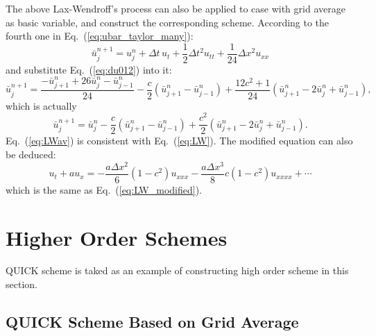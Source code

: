 \documentclass[]{article}
\begin{document}
The above Lax-Wendroff's process can also be applied to case with grid
average as basic variable, and construct the corresponding scheme.
According to the fourth one in Eq.~(\ref{eq:ubar_taylor_many}):
\[
    \bar u_{j}^{n+1}  = u_j^n+\Delta t\, u_t + \frac{1}{2}\Delta t^2
    u_{tt} + \frac{1}{24} \Delta x^2 u_{xx}
\]
and substitute Eq.~(\ref{eq:du012}) into it:
\[
    \bar u_j^{n+1}  = \frac{-\bar u_{j+1}^n + 26\bar u_j^n - \bar u_{j-1}^n}{24}-
    \frac{c}{2}\left(\bar u_{j+1}^n-\bar u_{j-1}^n\right) +
    \frac{12c^2+1}{24}\left(\bar u_{j+1}^n-2\bar u_j^n+\bar
    u_{j-1}^n\right),
\]
which is actually
\begin{equation}
    \bar u_j^{n+1} = \bar u_j^n -\frac{c}{2}\left(\bar u_{j+1}^n-\bar u_{j-1}^n\right) +
    \frac{c^2}{2}\left(\bar u_{j+1}^n-2\bar u_j^n+\bar u_{j-1}^n\right).
    \label{eq:LWav}
\end{equation}
Eq.~(\ref{eq:LWav}) is consistent with Eq.~(\ref{eq:LW}). The
modified equation can also be deduced:
\begin{equation*}
    u_t+au_x=-\frac{a\Delta x^2}{6}(1-c^2)u_{xxx} -\frac{a\Delta x^3}{8}c(1-c^2)u_{xxxx}+\cdots
\end{equation*}
which is the same as Eq.~(\ref{eq:LW_modified}).




\section{Higher Order Schemes}
\label{sec:higher-order-schemes}

QUICK scheme is taked as an example of constructing high order scheme in this
section.

\subsection{QUICK Scheme Based on Grid Average}
\label{sec:quick-scheme-based}
\end{document}
